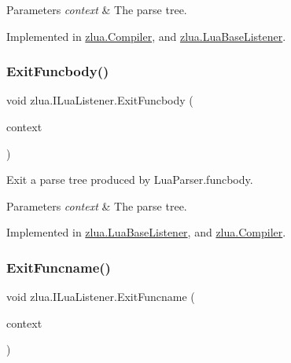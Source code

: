 \begin{DoxyParams}{Parameters}
{\em context} & The parse tree.\\
\hline
\end{DoxyParams}


Implemented in \mbox{\hyperlink{classzlua_1_1_compiler_a3c652ebce04bd5127161319606311859}{zlua.\+Compiler}}, and \mbox{\hyperlink{classzlua_1_1_lua_base_listener_a49406b24e09c5b7866b11d4554ca1531}{zlua.\+Lua\+Base\+Listener}}.

\mbox{\label{interfacezlua_1_1_i_lua_listener_aecf5d1d01d7cf2dbe880d431e6f5f66f}} 
\subsubsection{\texorpdfstring{Exit\+Funcbody()}{ExitFuncbody()}}
{\footnotesize\ttfamily void zlua.\+I\+Lua\+Listener.\+Exit\+Funcbody (\begin{DoxyParamCaption}\item[{\mbox{[}\+Not\+Null\mbox{]} \mbox{\hyperlink{classzlua_1_1_lua_parser_1_1_funcbody_context}{Lua\+Parser.\+Funcbody\+Context}}}]{context }\end{DoxyParamCaption})}



Exit a parse tree produced by Lua\+Parser.\+funcbody. 


\begin{DoxyParams}{Parameters}
{\em context} & The parse tree.\\
\hline
\end{DoxyParams}


Implemented in \mbox{\hyperlink{classzlua_1_1_lua_base_listener_add219d0a2aad2403b075bb1eb2550383}{zlua.\+Lua\+Base\+Listener}}, and \mbox{\hyperlink{classzlua_1_1_compiler_a42142f05b01646d0b407f241fd406939}{zlua.\+Compiler}}.

\mbox{\label{interfacezlua_1_1_i_lua_listener_aeae3611ef79ccd5c902a1016ebc2f6e4}} 
\subsubsection{\texorpdfstring{Exit\+Funcname()}{ExitFuncname()}}
{\footnotesize\ttfamily void zlua.\+I\+Lua\+Listener.\+Exit\+Funcname (\begin{DoxyParamCaption}\item[{\mbox{[}\+Not\+Null\mbox{]} \mbox{\hyperlink{classzlua_1_1_lua_parser_1_1_funcname_context}{Lua\+Parser.\+Funcname\+Context}}}]{context }\end{DoxyParamCaption})}



